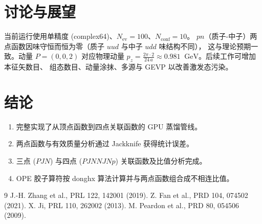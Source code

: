 \documentclass[11pt,a4paper]{article}
\newcommand{\gev}{\;\mathrm{GeV}}
\newcommand{\Nconf}{N_{\mathrm{conf}}}
\newcommand{\Nev}{N_{\mathrm{ev}}}
\begin{document}
\section{讨论与展望}
当前运行使用单精度 (complex64)、$\Nev=100$、$\Nconf=10$。
$pn$（质子-中子）两点函数因味守恒而恒为零（质子 $uud$ 与中子 $udd$ 味结构不同），
这与理论预期一致。动量 $P=(0,0,2)$ 对应物理动量
$p_z = \frac{2\pi\cdot 2}{24\,a}\approx 0.981\;\gev$。后续工作可增加本征矢数目、
组态数目、动量涂抹、多源与 GEVP 以改善激发态污染。

\section{结论}
\begin{enumerate}
    \item 完整实现了从顶点函数到四点关联函数的 GPU 蒸馏管线。
    \item 两点函数与有效质量分析通过 Jackknife 获得统计误差。
    \item 三点 ($PJN$) 与四点 ($PJNNJNp$) 关联函数及比值分析完成。
    \item OPE 胶子算符按 donghx 算法计算并与两点函数组合成不相连比值。
\end{enumerate}

\begin{thebibliography}{9}
 J.-H. Zhang et al., PRL 122, 142001 (2019).
 Z. Fan et al., PRD 104, 074502 (2021).
 X. Ji, PRL 110, 262002 (2013).
 M. Peardon et al., PRD 80, 054506 (2009).
\end{thebibliography}
\end{document}
